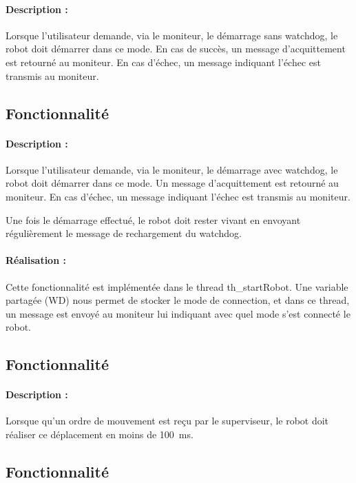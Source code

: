 \documentclass[11pt, a4paper]{paper}
\newcounter{cptreq}
\begin{document}
{{{\paragraph{Description :} Lorsque l'utilisateur demande, via le moniteur, le démarrage sans watchdog, le robot doit démarrer dans ce mode. En cas de succès, un message d'acquittement est retourné au moniteur. En cas d'échec, un message indiquant l'échec est transmis au moniteur.

}
\subsection{Fonctionnalité \thecptreq}

\paragraph{Description :} Lorsque l'utilisateur demande, via le moniteur, le démarrage avec watchdog, le robot doit démarrer dans ce mode. Un message d'acquittement est retourné au moniteur. En cas d'échec, un message indiquant l'échec est transmis au moniteur.

Une fois le démarrage effectué, le robot doit rester vivant en envoyant régulièrement le message de rechargement du watchdog.

\paragraph{\color{black}Réalisation :}  {\color{black} Cette fonctionnalité est implémentée dans le thread th\_startRobot. Une variable partagée (WD) nous permet de stocker le mode de connection, et dans ce thread, un message est envoyé au moniteur lui indiquant avec quel mode s'est connecté le robot.}

{\color{black}
\subsection{Fonctionnalité \thecptreq *}

\paragraph{Description :} Lorsque qu'un ordre de mouvement est reçu par le superviseur, le robot doit réaliser ce déplacement en moins de 100~ms.

}
\subsection{Fonctionnalité \thecptreq}

}}
\end{document}
